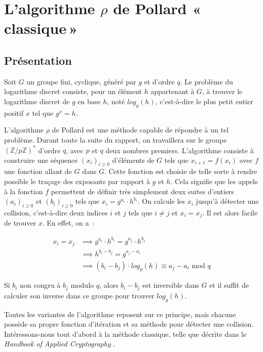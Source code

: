 \chapter{L'algorithme \texorpdfstring{$\rho$}{Rho} de Pollard «\texorpdfstring{\,}{\ }classique\texorpdfstring{\,}{\ }»}
    	\section{Présentation}
    	Soit $G$ un groupe fini, cyclique, généré par $g$ et d'ordre $q$. Le problème du logarithme discret consiste, pour un élément $h$ appartenant à $G$, à trouver le logarithme discret de $g$ en base $h$, noté $log_g(h)$, c'est-à-dire le plus petit entier positif $x$ tel que $g^x = h$.

    	L'algorithme $\rho$ de Pollard est une méthode capable de répondre à un tel problème. Durant toute la suite du rapport, on travaillera sur le groupe $(\mathbb{Z}/p\mathbb{Z})^*$ d'ordre $q$, avec $p$ et $q$ deux nombres premiers. L'algorithme consiste à construire une séquence $(x_i)_{i \ge 0}$ d'éléments de $G$ tels que $x_{i+1} = f(x_i)$ avec $f$ une fonction allant de $G$ dans $G$. Cette fonction est choisie de telle sorte à rendre possible le traçage des exposants par rapport à $g$ et $h$. Cela signifie que les appels à la fonction $f$ permettent de définir très simplement deux suites d'entiers $(a_i)_{i \ge 0}$ et $(b_i)_{i \ge 0}$ tels que $x_i = g^{a_i} \cdot h^{b_i}$. On calcule les $x_i$ jusqu'à détecter une collision, c'est-à-dire deux indices $i$ et $j$ tels que $i \ne j$ et $x_i = x_j$. Il est alors facile de trouver $x$. En effet, on a~:

    	\begin{align*}
          x_i = x_j &\implies g^{a_i} \cdot h^{b_i} = g^{a_j} \cdot h^{b_j} \\
                    &\implies h^{b_i - b_j} = g^{a_j - a_i} \\
                    &\implies (b_i - b_j) \cdot log_g(h) \equiv a_j - a_i \text{\ mod } q
        \end{align*}

        Si $b_i$ non congru à $b_j$ modulo $q$, alors $b_i - b_j$ est inversible dans $G$ et il suffit de calculer son inverse dans ce groupe pour trouver $log_g(h)$.

    	Toutes les variantes de l'algorithme reposent sur ce principe, mais chacune possède sa propre fonction d'itération et sa méthode pour détecter une collision. Intéressons-nous tout d'abord à la méthode classique, telle que décrite dans le \textit{Handbook of Applied Cryptography} \autocite[106]{handbook}.

